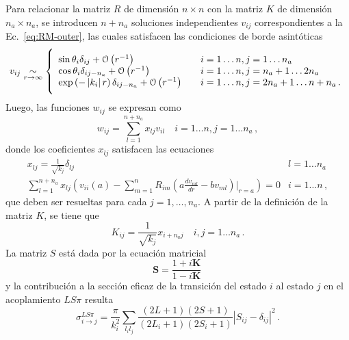 Para relacionar la matriz $R$ de dimensión $n\times n$ con la matriz 
$K$ de dimensión $n_a\times n_a$, se introducen $n+n_a$ soluciones 
independientes $v_{ij}$ correspondientes a la Ec.~\ref{eq:RM-outer}, 
las cuales satisfacen las condiciones de borde asintóticas
\begin{equation}
v_{ij}\underset{r \rightarrow \infty}{\sim} \vast\{
\begin{array}{ll}
\sin\theta_i\delta_{ij}+\mathcal{O}\left(r^{-1}\right) 
&\quad i=1\ldots n,j=1\ldots n_a \\
\cos\theta_{i}\delta_{ij-n_a}+\mathcal{O}\left(r^{-1}\right) 
&\quad i=1\ldots n,j=n_a+1\ldots 2n_a \\
\exp\left(-\left|k_i\right|r\right)\delta_{ij-n_a}+\mathcal{O}\left(r^{-1}\right)
&\quad i=1\ldots n,j=2n_a+1\ldots n+n_a\,.
\end{array}
\end{equation}
Luego, las funciones $w_{ij}$ se expresan como
\begin{equation}
w_{ij}=\sum_{l=1}^{n+n_a}x_{lj}v_{il}\quad i=1 \ldots n, j=1 \ldots n_a\,,
\end{equation}
donde los coeficientes $x_{lj}$ satisfacen las ecuaciones
\begin{equation}
\begin{array}{cl}
x_{lj}=\frac{1}{\sqrt{k_j}} \delta_{lj} & l=1 \ldots n_a \\
\sum_{l=1}^{n+n_a} x_{lj}\left(v_{ii}(a)-\sum_{m=1}^n R_{im}
\left(a\frac{d v_{ml}}{dr}-b v_{ml}\right)\bigg|_{r=a}\right)=0 & 
i=1 \ldots n\,,
\end{array}
\end{equation}
que deben ser resueltas para cada $j=1,\dots,n_a$. A partir de la
definición de la matriz $K$, se tiene que
\begin{equation}
K_{ij}=\frac{1}{\sqrt{k_j}} x_{i+n_aj} \quad i,j=1 \ldots n_a\,.
\end{equation}
La matriz $S$ está dada por la ecuación matricial
\begin{equation}
\mathbf{S}=\frac{1+i \mathbf{K}}{1-i \mathbf{K}}\,
\end{equation}
y la contribución a la sección eficaz de la transición del estado $i$ 
al estado $j$ en el acoplamiento $LS\pi$ resulta
\begin{equation}
\sigma_{i \rightarrow j}^{LS\pi}=\frac{\pi}{k_i^2} \sum_{l_il_j} 
\frac{(2L+1)(2S+1)}{\left(2L_i+1\right)\left(2S_i+1\right)}
\left|S_{ij}-\delta_{ij}\right|^{2}\,.
\end{equation}

